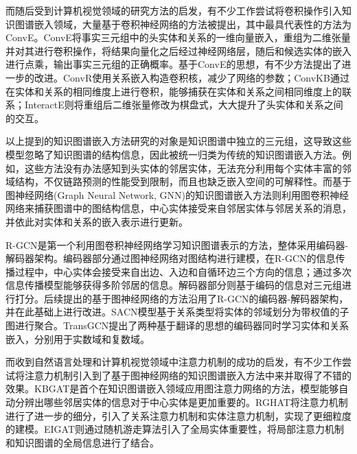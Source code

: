 而随后受到计算机视觉领域的研究方法的启发，有不少工作尝试将卷积操作引入知识图谱嵌入领域，大量基于卷积神经网络的方法被提出，其中最具代表性的方法为ConvE。ConvE将事实三元组中的头实体和关系的一维向量嵌入，重组为二维张量并对其进行卷积操作，将结果向量化之后经过神经网络层，随后和候选实体的嵌入进行点乘，输出事实三元组的正确概率。基于ConvE的思想，有不少方法提出了进一步的改进。ConvR使用关系嵌入构造卷积核，减少了网络的参数；ConvKB通过在实体和关系的相同维度上进行卷积，能够捕获在实体和关系之间相同维度上的联系；InteractE则将重组后二维张量修改为棋盘式，大大提升了头实体和关系之间的交互。

以上提到的知识图谱嵌入方法研究的对象是知识图谱中独立的三元组，这导致这些模型忽略了知识图谱的结构信息，因此被统一归类为传统的知识图谱嵌入方法。例如，这些方法没有办法感知到头实体的邻居实体，无法充分利用每个实体丰富的邻域结构，不仅链路预测的性能受到限制，而且也缺乏嵌入空间的可解释性。而基于图神经网络(Graph Neural Network, GNN)的知识图谱嵌入方法则利用图卷积神经网络来捕获图谱中的图结构信息，中心实体接受来自邻居实体与邻居关系的消息，并依此对实体和关系的嵌入表示进行更新。

R-GCN是第一个利用图卷积神经网络学习知识图谱表示的方法，整体采用编码器-解码器架构。编码器部分通过图神经网络对图结构进行建模，在R-GCN的信息传播过程中，中心实体会接受来自出边、入边和自循环边三个方向的信息；通过多次信息传播模型能够获得多阶邻居的信息。解码器部分则基于编码的信息对三元组进行打分。后续提出的基于图神经网络的方法沿用了R-GCN的编码器-解码器架构，并在此基础上进行改进。SACN模型基于关系类型将实体的邻域划分为带权值的子图进行聚合。TransGCN提出了两种基于翻译的思想的编码器同时学习实体和关系嵌入，分别用于实数域和复数域。

而收到自然语言处理和计算机视觉领域中注意力机制的成功的启发，有不少工作尝试将注意力机制引入到了基于图神经网络的知识图谱嵌入方法中来并取得了不错的效果。KBGAT是首个在知识图谱嵌入领域应用图注意力网络的方法，模型能够自动分辨出哪些邻居实体的信息对于中心实体是更加重要的。RGHAT将注意力机制进行了进一步的细分，引入了关系注意力机制和实体注意力机制，实现了更细粒度的建模。EIGAT则通过随机游走算法引入了全局实体重要性，将局部注意力机制和知识图谱的全局信息进行了结合。

